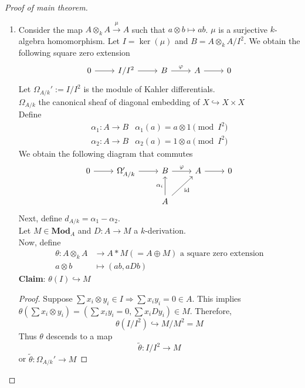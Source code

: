 \documentclass[oneside, 12pt]{scrbook}
\theoremstyle{theorem}
\begin{document}
\begin{proof}[Proof of main theorem]
\begin{enumerate}
\item Consider the map $A\otimes_{k} A \xrightarrow{\mu} A$ such that $a \otimes b \mapsto ab$. $\mu$ is a surjective $k$-algebra homomorphism. Let $I = \ker(\mu)$ and $B = A \otimes_{k} A/I^2$. We obtain the following square zero extension
\[\begin{tikzcd}
	0 & {I/I^2} & B & A & 0
	\arrow[from=1-1, to=1-2]
	\arrow[from=1-2, to=1-3]
	\arrow["\varphi", from=1-3, to=1-4]
	\arrow[from=1-4, to=1-5]
\end{tikzcd}\]
Let $\Omega_{A/k}' := I/I^2$ is the module of Kahler differentials. \\
$\Omega_{A/k}$ the canonical sheaf of diagonal embedding of $X \hookrightarrow X \times X$\\
Define 
\begin{align*}
\alpha_{1}: A \rightarrow B & \alpha_{1}(a) = a\otimes 1 \pmod{I^2} \\
\alpha_{2}: A \rightarrow B & \alpha_{2}(a) = 1\otimes a \pmod{I^2}
\end{align*}
We obtain the following diagram that commutes
\[\begin{tikzcd}
	0 & {\Omega_{A/k}'} & B & A & 0 \\
	&& A
	\arrow[from=1-1, to=1-2]
	\arrow[from=1-2, to=1-3]
	\arrow["\varphi", from=1-3, to=1-4]
	\arrow[from=1-4, to=1-5]
	\arrow["{\alpha_{i}}", from=2-3, to=1-3]
	\arrow["{\mathrm{id}}"', from=2-3, to=1-4]
\end{tikzcd}\]
Next, define $d_{A/k} = \alpha_{1} - \alpha_{2}$.\\
Let $M \in \mathbf{Mod}_{A}$ and $D: A \rightarrow M$ a $k$-derivation. \\
Now, define
\begin{align*}
\theta: A \otimes_{k} A &\rightarrow A *M (= A \oplus M) \text{ a square zero extension}\\
a\otimes b &\mapsto (ab, aDb)
\end{align*}
\textbf{Claim}:  $\theta(I) \hookrightarrow M$
\begin{proof}
Suppose $\sum x_{i} \otimes y_{i} \in I \Rightarrow \sum x_{i}y_{i} = 0 \in A$. This implies $\theta(\sum x_{i}\otimes y_{i}) = (\sum x_{i}y_{i}=0 , \sum x_{i} Dy_{i}) \in M$. Therefore, $$\theta (I/I^2) \hookrightarrow M/M^2 = M$$
Thus $\theta$ descends to a map $$\tilde{\theta} : I/I^2 \rightarrow M$$ or $\tilde{\theta} : \Omega_{A/k}' \rightarrow M$
\end{proof}

\end{enumerate}
\end{proof}
\end{document}
